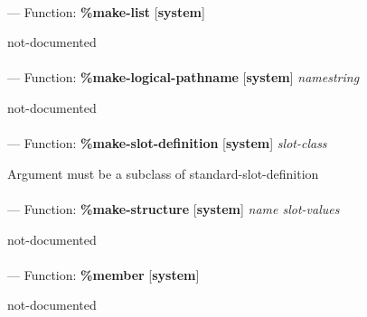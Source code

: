 \paragraph{}
\label{SYSTEM:MAKE-LIST}
--- Function: \textbf{\%make-list} [\textbf{system}] \textit{}

\begin{adjustwidth}{5em}{5em}
not-documented
\end{adjustwidth}

\paragraph{}
\label{SYSTEM:MAKE-LOGICAL-PATHNAME}
--- Function: \textbf{\%make-logical-pathname} [\textbf{system}] \textit{namestring}

\begin{adjustwidth}{5em}{5em}
not-documented
\end{adjustwidth}

\paragraph{}
\label{SYSTEM:MAKE-SLOT-DEFINITION}
--- Function: \textbf{\%make-slot-definition} [\textbf{system}] \textit{slot-class}

\begin{adjustwidth}{5em}{5em}
Argument must be a subclass of standard-slot-definition
\end{adjustwidth}

\paragraph{}
\label{SYSTEM:MAKE-STRUCTURE}
--- Function: \textbf{\%make-structure} [\textbf{system}] \textit{name slot-values}

\begin{adjustwidth}{5em}{5em}
not-documented
\end{adjustwidth}

\paragraph{}
\label{SYSTEM:MEMBER}
--- Function: \textbf{\%member} [\textbf{system}] \textit{}

\begin{adjustwidth}{5em}{5em}
not-documented
\end{adjustwidth}

